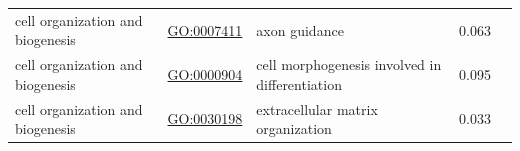 \documentclass[
]{article}
\begin{document}
\begin{longtable}[]{@{}lllll@{}}
\begin{minipage}[t]{0.17\columnwidth}\raggedright
cell organization and biogenesis\strut
\end{minipage} & \begin{minipage}[t]{0.17\columnwidth}\raggedright
\url{GO:0007411}\strut
\end{minipage} & \begin{minipage}[t]{0.17\columnwidth}\raggedright
axon guidance\strut
\end{minipage} & \begin{minipage}[t]{0.17\columnwidth}\raggedright
0.063\strut
\end{minipage} & \begin{minipage}[t]{0.17\columnwidth}\raggedright
\strut
\end{minipage}\tabularnewline
\begin{minipage}[t]{0.17\columnwidth}\raggedright
cell organization and biogenesis\strut
\end{minipage} & \begin{minipage}[t]{0.17\columnwidth}\raggedright
\url{GO:0000904}\strut
\end{minipage} & \begin{minipage}[t]{0.17\columnwidth}\raggedright
cell morphogenesis involved in differentiation\strut
\end{minipage} & \begin{minipage}[t]{0.17\columnwidth}\raggedright
0.095\strut
\end{minipage} & \begin{minipage}[t]{0.17\columnwidth}\raggedright
\strut
\end{minipage}\tabularnewline
\begin{minipage}[t]{0.17\columnwidth}\raggedright
cell organization and biogenesis\strut
\end{minipage} & \begin{minipage}[t]{0.17\columnwidth}\raggedright
\url{GO:0030198}\strut
\end{minipage} & \begin{minipage}[t]{0.17\columnwidth}\raggedright
extracellular matrix organization\strut
\end{minipage} & \begin{minipage}[t]{0.17\columnwidth}\raggedright
0.033\strut
\end{minipage} & \begin{minipage}[t]{0.17\columnwidth}\raggedright
\strut
\end{minipage}\tabularnewline

\end{longtable}
\end{document}
